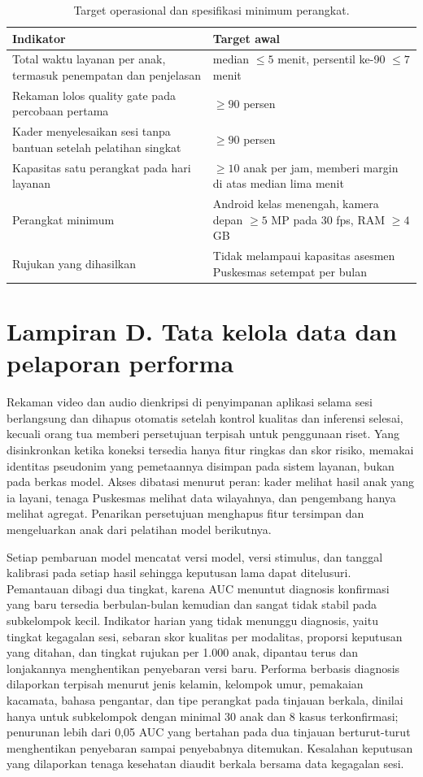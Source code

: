 \documentclass[10pt,letterpaper]{article}
\begin{document}
\begin{table}[H]
\centering
\small
\caption{Target operasional dan spesifikasi minimum perangkat.}
\label{tab:pilot}
\begin{tabular}{@{}p{}p{}@{}}
\toprule
\textbf{Indikator} & \textbf{Target awal} \\
\midrule
Total waktu layanan per anak, termasuk penempatan dan penjelasan & median $\leq 5$ menit, persentil ke-90 $\leq 7$ menit \\
Rekaman lolos quality gate pada percobaan pertama & $\geq 90$ persen \\
Kader menyelesaikan sesi tanpa bantuan setelah pelatihan singkat & $\geq 90$ persen \\
Kapasitas satu perangkat pada hari layanan & $\geq 10$ anak per jam, memberi margin di atas median lima menit \\
Perangkat minimum & Android kelas menengah, kamera depan $\geq 5$ MP pada 30 fps, RAM $\geq 4$ GB \\
Rujukan yang dihasilkan & Tidak melampaui kapasitas asesmen Puskesmas setempat per bulan \\
\bottomrule
\end{tabular}
\end{table}

\section*{Lampiran D. Tata kelola data dan pelaporan performa}

Rekaman video dan audio dienkripsi di penyimpanan aplikasi selama sesi berlangsung dan
dihapus otomatis setelah kontrol kualitas dan inferensi selesai, kecuali orang tua memberi
persetujuan terpisah untuk penggunaan riset. Yang disinkronkan ketika koneksi tersedia hanya
fitur ringkas dan skor risiko, memakai identitas pseudonim yang pemetaannya disimpan pada
sistem layanan, bukan pada berkas model. Akses dibatasi menurut peran: kader melihat hasil
anak yang ia layani, tenaga Puskesmas melihat data wilayahnya, dan pengembang hanya melihat
agregat. Penarikan persetujuan menghapus fitur tersimpan dan mengeluarkan anak dari
pelatihan model berikutnya.

Setiap pembaruan model mencatat versi model, versi stimulus, dan tanggal kalibrasi pada
setiap hasil sehingga keputusan lama dapat ditelusuri. Pemantauan dibagi dua tingkat, karena
AUC menuntut diagnosis konfirmasi yang baru tersedia berbulan-bulan kemudian dan sangat
tidak stabil pada subkelompok kecil. Indikator harian yang tidak menunggu diagnosis, yaitu
tingkat kegagalan sesi, sebaran skor kualitas per modalitas, proporsi keputusan yang ditahan,
dan tingkat rujukan per 1.000 anak, dipantau terus dan lonjakannya menghentikan penyebaran
versi baru. Performa berbasis diagnosis dilaporkan terpisah menurut jenis kelamin, kelompok
umur, pemakaian kacamata, bahasa pengantar, dan tipe perangkat pada tinjauan berkala,
dinilai hanya untuk subkelompok dengan minimal 30 anak dan 8 kasus terkonfirmasi; penurunan
lebih dari 0,05 AUC yang bertahan pada dua tinjauan berturut-turut menghentikan penyebaran
sampai penyebabnya ditemukan. Kesalahan keputusan yang dilaporkan tenaga kesehatan diaudit
berkala bersama data kegagalan sesi.
\end{document}
